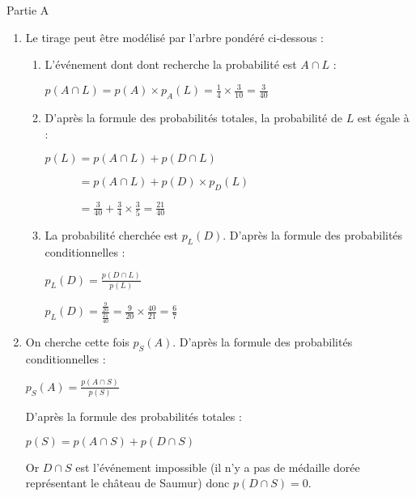 \begin{corrige}
     \begin{h3}Partie A\end{h3}
     \begin{enumerate}
          \item
          Le tirage peut être modélisé par l'arbre pondéré ci-dessous :

\begin{center}
\end{center}

          \begin{enumerate}
               \item
               L'événement dont dont recherche la probabilité est $A \cap L$ :
               \par
               $p(A \cap L)=p(A) \times p_A(L)=\frac{1}{4} \times \frac{3}{10}=\frac{3}{40}$
               \item
               D'après la formule des probabilités totales, la probabilité de $L$ est égale à :
               \par
               $p(L)=p(A \cap L)+p(D \cap L)$
               \par
               $\phantom{p(L)}=p(A \cap L)+p(D) \times p_D(L)$
               \par
               $\phantom{p(L)}=\frac{3}{40}+\frac{3}{4}\times \frac{3}{5}=\frac{21}{40}$
               \item
               La probabilité cherchée est $p_L(D)$. D'après la formule des probabilités conditionnelles :
               \par
               $p_L(D)=\frac{p(D \cap L)}{p(L)}$
               \par
               $p_L(D)=\frac{\frac{9}{20}}{\frac{21}{40}}=\frac{9}{20} \times \frac{40}{21}=\frac{6}{7}$
          \end{enumerate}
          \item
          On cherche cette fois $p_S(A)$. D'après la formule des probabilités conditionnelles :
          \par
          $p_S(A)=\frac{p(A \cap S)}{p(S)}$
          \par
          D'après la formule des probabilités totales :
          \par
          $p(S)=p(A \cap S) + p(D \cap S)$
          \par
          Or $D \cap S$ est l'événement impossible (il n'y a pas de médaille dorée représentant le château de Saumur) donc $p(D \cap S)=0$.

\end{enumerate}
\end{corrige}
